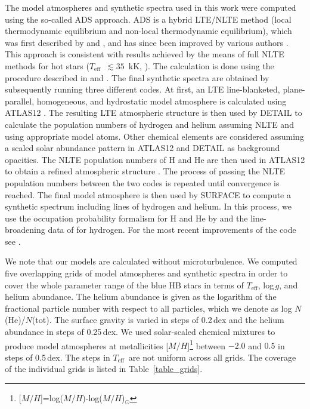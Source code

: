 \documentclass{aa}
\newcommand{\teff}{$T_{\text{eff}}$}
\begin{document}
The model atmospheres and synthetic spectra used in this work were computed using the so-called ADS approach.
ADS is a hybrid LTE/NLTE method (local thermodynamic equilibrium and non-local thermodynamic equilibrium), which was first described by \citet{przybilla2006} and \citet{nieva2007}, and has since been improved by various authors \citep{przybilla2011,irrgang2014,irrgang2018}. This approach is consistent with results achieved by the means of full NLTE methods for hot stars (\teff\ $\lesssim 35$~kK, \citealt{przybilla2011}).
The calculation is done using the procedure described in \cite{irrgang2018} and \cite{kreuzer20}.
The final synthetic spectra are obtained by subsequently running three different codes.
At first, an LTE line-blanketed, plane-parallel, homogeneous, and hydrostatic model atmosphere is calculated using ATLAS12 \citep{Kurucz96}. The resulting LTE atmospheric structure is then used by DETAIL \citep{giddings81,butler85} to calculate the population numbers of hydrogen \citep{przybilla04} and helium \citep{przybilla05} assuming NLTE and using appropriate model atoms.
Other chemical elements are considered assuming a scaled solar abundance pattern \citep{asplund09} in ATLAS12 and DETAIL as background opacities.
The NLTE population numbers of H and He are then used in ATLAS12 to obtain a refined atmospheric structure \citep{2018A&A...620A..48I}. 
The process of passing the NLTE population numbers between the two codes is repeated until convergence is reached.
The final model atmosphere is then used by SURFACE \citep{giddings81,butler85} to compute a synthetic spectrum including lines of hydrogen and helium.
In this process, we use the occupation probability formalism \citep{hummer88} for H and He by \cite{hubeny94} and the line-broadening data of \cite{tremblay09} for hydrogen. For the most recent improvements of the code see \citet{2021A&A...650A.102I,2022NatAs...6.1414I}. 

We note that our models are calculated without microturbulence.
We computed five overlapping grids of model atmospheres and synthetic spectra
in order to cover the whole parameter range of the blue HB stars in terms of \teff, log\,$g$, and helium abundance.
The helium abundance is given as the logarithm of the fractional particle number with respect to all particles, which we denote as log $N$(He)/$N$(tot). 
The surface gravity is varied in steps of 0.2\,dex and the helium abundance in steps of 0.25\,dex.
We used solar-scaled chemical mixtures to produce model atmospheres at metallicities [$M/H$]\footnote{[$M/H$]=log($M/H$)-log($M/H$)$_\odot$} between $-2.0$ and $0.5$ in steps of 0.5\,dex.
The steps in \teff\ are not uniform across all grids.
The coverage of the individual grids is listed in Table~\ref{table_grids}.
\end{document}
